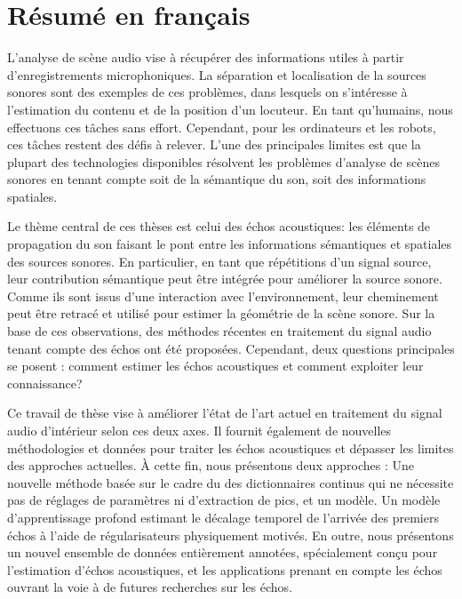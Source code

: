 \chapter*{Résumé en français}

\small

    L'analyse
     de scène audio vise à récupérer des informations utiles à partir d'enregistrements microphoniques.
    La séparation et localisation de la sources sonores sont des exemples de ces problèmes, dans lesquels on s'intéresse à l'estimation du contenu et de la position d'un locuteur.
    En tant qu'humains, nous effectuons ces tâches sans effort.
    Cependant, pour les ordinateurs et les robots, ces tâches restent des défis à relever.
    L'une des principales limites est que la plupart des technologies disponibles résolvent les problèmes d'analyse de scènes sonores en tenant compte soit de la sémantique du son, soit des informations spatiales.

    \mynewline
    Le thème central de ces thèses est celui des échos acoustiques: les éléments de propagation du son faisant le pont entre les informations sémantiques et spatiales des sources sonores.
    En particulier, en tant que répétitions d'un signal source, leur contribution sémantique peut être intégrée pour améliorer la source sonore.
    Comme ils sont issus d'une interaction avec l'environnement, leur cheminement peut être retracé et utilisé pour estimer la géométrie de la scène sonore.
    Sur la base de ces observations, des méthodes récentes en traitement du signal audio tenant compte des échos ont été proposées.
    Cependant, deux questions principales se posent : comment estimer les échos acoustiques et comment exploiter leur connaissance?

    \mynewline
    Ce travail de thèse vise à améliorer l'état de l'art actuel en traitement du signal audio d'intérieur selon ces deux axes.
    Il fournit également de nouvelles méthodologies et données pour traiter les échos acoustiques et dépasser les limites des approches actuelles.
    À cette fin, nous présentons deux approches :
    Une nouvelle méthode basée sur le cadre du des dictionnaires continus qui ne nécessite pas de réglages de paramètres ni d'extraction de pics, et un modèle.
    Un modèle d'apprentissage profond estimant le décalage temporel de l'arrivée des premiers échos à l'aide de régularisateurs physiquement motivés.
    En outre, nous présentons un nouvel ensemble de données entièrement annotées, spécialement conçu pour l'estimation d'échos acoustiques, et les applications prenant en compte les échos ouvrant la voie à de futures recherches sur les échos.

